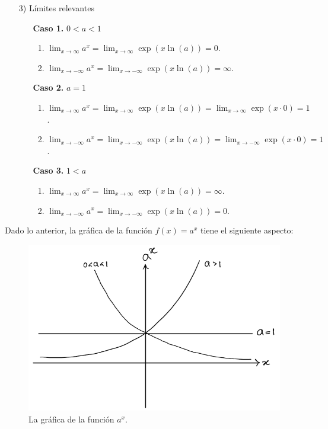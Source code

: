 \documentclass{article}
\numberwithin{equation}{section}
\newcommand{\limit}[2]{\lim_{#1\to #2}}
\newcommand{\limf}[1]{\lim_{#1\to\infty}}
\begin{document}
\begin{enumerate}
\begin{enumerate}
    \end{enumerate}
    
    \item[3)] Límites relevantes 
    
    \begin{enumerate}
    
    \item[\textbf{Caso 1.}]  $0<a<1$
    \begin{enumerate}
    \item $\limf{x}a^x=\limf{x}\exp(x\ln(a))=0$.
    \item $\limit{x}{-\infty}a^x=\limit{x}{-\infty}\exp(x\ln(a))=\infty$.
    \end{enumerate} 
    
    \item[\textbf{Caso 2.}]  $a=1$
    \begin{enumerate}
    \item $\limf{x}a^x=\limf{x}\exp(x\ln(a))=\limf{x}\exp(x\cdot 0)=1$.
    \item $\limit{x}{-\infty}a^x=\limit{x}{-\infty}\exp(x\ln(a))=\limit{x}{-\infty}\exp(x\cdot 0)=1$.
    \end{enumerate} 
    
    \item[\textbf{Caso 3.}]  $1<a$
    \begin{enumerate}
    \item $\limf{x}a^x=\limf{x}\exp(x\ln(a))=\infty$.
    \item $\limit{x}{-\infty}a^x=\limit{x}{-\infty}\exp(x\ln(a))=0$.
    \end{enumerate} 
    
    \end{enumerate}
    
\end{enumerate}

\vspace{0.5cm}

Dado lo anterior, la gráfica de la función $f(x)=a^x$ tiene el siguiente aspecto:

\begin{figure}[H]
    \centering
    \includegraphics[scale=0.4]{images/fig14.png}
    \caption{La gráfica de la función $a^x$.}
    \label{fig:fig14                                                    }
\end{figure}
\end{document}
